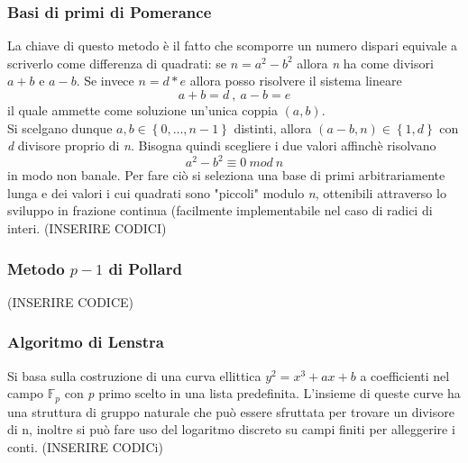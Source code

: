 \documentclass{article}
\begin{document}
\subsubsection{Basi di primi di Pomerance}
La chiave di questo metodo è il fatto che scomporre un numero dispari equivale a scriverlo come differenza di quadrati: se \(n=a^2-b^2\) allora \textit{n} ha come divisori \(a+b\) e \(a-b\). Se invece \(n=d*e\) allora posso risolvere il sistema lineare 
\[a+b=d\ ,\ a-b=e\]
il quale ammette come soluzione un'unica coppia \((a,b)\).\\ 
Si scelgano dunque \(a,b\in\left\{0,...,n-1\right\}\) distinti, allora \((a-b,n)\in\left\{1,d\right\}\) con \textit{d} divisore proprio di \textit{n}.
Bisogna quindi scegliere i due valori affinchè risolvano 
\[a^2-b^2\equiv 0\ mod\ n \] in modo non banale.
Per fare ciò si seleziona una base di primi arbitrariamente lunga e dei valori i cui quadrati sono "piccoli" modulo \textit{n}, ottenibili attraverso lo sviluppo in frazione continua (facilmente implementabile nel caso di radici di interi. (INSERIRE CODICI)
\subsubsection{Metodo \(p-1\) di Pollard}
(INSERIRE CODICE)\\
\subsubsection{Algoritmo di Lenstra}
Si basa sulla costruzione di una curva ellittica \(y^2=x^3+ax+b\) a coefficienti nel campo \(\mathbb{F}_p\) con \textit{p} primo scelto in una lista predefinita. L'insieme di queste curve ha una struttura di gruppo naturale che può essere sfruttata per trovare un divisore di n, inoltre si può fare uso del logaritmo discreto su campi finiti per alleggerire i conti. (INSERIRE CODICi)\\
\end{document}
